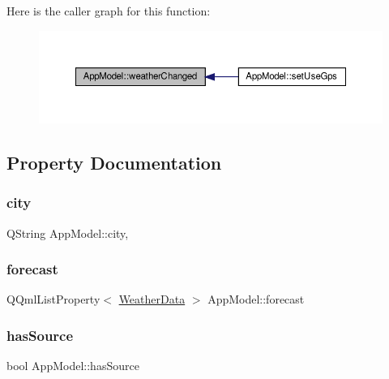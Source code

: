Here is the caller graph for this function\+:\nopagebreak
\begin{figure}[H]
\begin{center}
\leavevmode
\includegraphics[width=350pt]{class_app_model_a83e61455ed5672333b0db45f3f86417c_icgraph}
\end{center}
\end{figure}


\subsection{Property Documentation}
\mbox{\label{class_app_model_aa6915cabdaaf04805e00b5a2f75311e8}} 
\subsubsection{\texorpdfstring{city}{city}}
{\footnotesize\ttfamily Q\+String App\+Model\+::city\hspace{0.3cm}{\ttfamily [read]}, {\ttfamily [write]}}

\mbox{\label{class_app_model_a3e45f56df91b1ad6d27c02c4ab1ad3c3}} 
\subsubsection{\texorpdfstring{forecast}{forecast}}
{\footnotesize\ttfamily Q\+Qml\+List\+Property$<$ \hyperlink{class_weather_data}{Weather\+Data} $>$ App\+Model\+::forecast\hspace{0.3cm}{\ttfamily [read]}}

\mbox{\label{class_app_model_a2d25ce9151aea6a45cae797756a84445}} 
\subsubsection{\texorpdfstring{has\+Source}{hasSource}}
{\footnotesize\ttfamily bool App\+Model\+::has\+Source\hspace{0.3cm}{\ttfamily [read]}}

